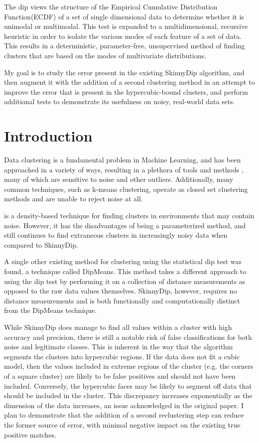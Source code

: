 \documentclass{sig-alternate-05-2015}
\begin{document}
The dip views the structure of the Empirical Cumulative Distribution Function(ECDF) of a set of single dimensional data to determine whether it is unimodal or multimodal. This test is expanded to a multidimensional, recursive heuristic in order to isolate the various modes of each feature of a set of data. This results in a deterministic, parameter-free, unsupervised method of finding clusters that are based on the modes of multivariate distributions. 

My goal is to study the error present in the existing SkinnyDip algorithm, and then augment it with the addition of a second clustering method in an attempt to improve the error that is present in the hypercubic-bound clusters, and perform additional tests to demonstrate its usefulness on noisy, real-world data sets.


\section{Introduction}
Data clustering is a fundamental problem in Machine Learning, and has been approached in a variety of ways, resulting in a plethora of tools and methods \cite{ClusteringMethods}, many of which are sensitive to noise and other outliers. Additionally, many common techniques, such as k-means clustering, operate as closed set clustering methods and are unable to reject noise at all.

\cite{DBSCAN} is a density-based technique for finding clusters in environments that may contain noise. However, it has the disadvantages of being a parameterized method, and still continues to find extraneous clusters in increasingly noisy data when compared to SkinnyDip.

A single other existing method for clustering using the statistical dip test was found, a technique called DipMeans\cite{dipmeans}. This method takes a different approach to using the dip test by performing it on a collection of distance measurements as opposed to the raw data values themselves. SkinnyDip, however, requires no distance measurements  and is both functionally and computationally distinct from the DipMeans technique.

While SkinnyDip does manage to find all values within a cluster with high accuracy and precision, there is still a notable risk of false classifications for both noise and legitimate classes. This is inherent in the way that the algorithm segments the clusters into hypercubic regions. If the data does not fit a cubic model, then the values included in extreme regions of the cluster (e.g. the corners of a square cluster) are likely to be false positives and should not have been included. Conversely, the hypercubic faces may be likely to segment off data that should be included in the cluster.  This discrepancy increases exponentially as the dimension of the data increases, an issue acknowledged in the original paper\cite{skinnydip}. I plan to demonstrate that the addition of a second reclustering step can reduce the former source of error, with minimal negative impact on the existing true positive matches.
\end{document}
